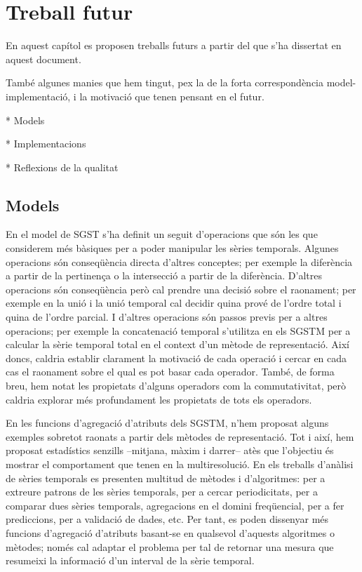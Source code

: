\chapter{Treball futur}
\label{sec:futur}



En aquest capítol es proposen treballs futurs a partir del que s'ha  dissertat en aquest document.

També algunes manies que hem tingut, pex la de la forta correspondència model-implementació, i la motivació que tenen pensant en el futur.


* Models

* Implementacions

* Reflexions de la qualitat



\section{Models}



En el model de \gls{SGST} s'ha definit un seguit d'operacions que són
les que considerem més bàsiques per a poder manipular les sèries
temporals. Algunes operacions són conseqüència directa d'altres
conceptes; per exemple la diferència a partir de la pertinença o la
intersecció a partir de la diferència. D'altres operacions són
conseqüència però cal prendre una decisió sobre el raonament; per
exemple en la unió i la unió temporal cal decidir quina prové de
l'ordre total i quina de l'ordre parcial.  I d'altres operacions són
passos previs per a altres operacions; per exemple la concatenació
temporal s'utilitza en els \gls{SGSTM} per a calcular la sèrie
temporal total en el context d'un mètode de representació.  Així
doncs, caldria establir clarament la motivació de cada operació i
cercar en cada cas el raonament sobre el qual es pot basar cada
operador. També, de forma breu, hem notat les propietats d'alguns
operadors com la commutativitat, però caldria explorar més
profundament les propietats de tots els operadors.


En les funcions d'agregació d'atributs dels \gls{SGSTM}, n'hem
proposat alguns exemples sobretot raonats a partir dels mètodes de
representació. Tot i així, hem proposat estadístics senzills
--mitjana, màxim i darrer-- atès que l'objectiu és mostrar el
comportament que tenen en la multiresolució.  En els treballs
d'anàlisi de sèries temporals es presenten multitud de mètodes i
d'algoritmes: per a extreure patrons de les sèries temporals, per a
cercar periodicitats, per a comparar dues sèries temporals,
agregacions en el domini freqüencial, per a fer prediccions, per a
validació de dades, etc. Per tant, es poden dissenyar més funcions
d'agregació d'atributs basant-se en qualsevol d'aquests algoritmes o
mètodes; només cal adaptar el problema per tal de retornar una mesura
que resumeixi la informació d'un interval de la sèrie temporal.



